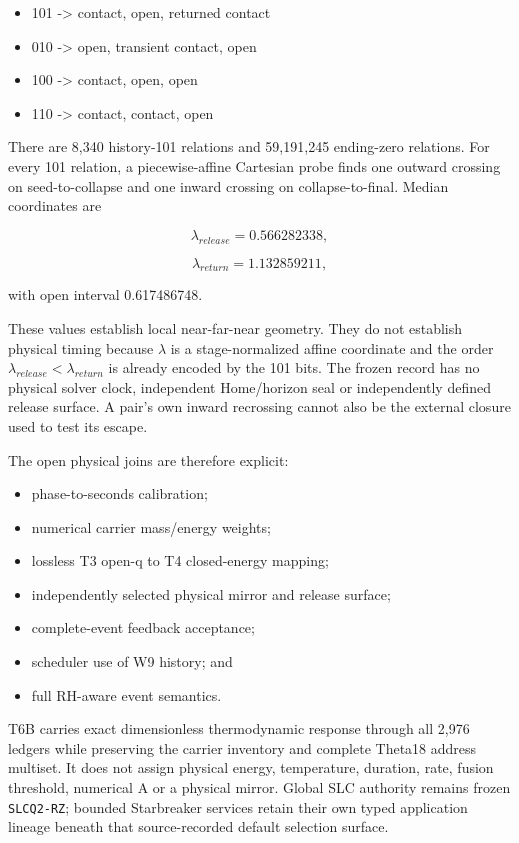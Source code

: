 \begin{itemize}
\tightlist
\item
  101 -\textgreater{} contact, open, returned contact
\item
  010 -\textgreater{} open, transient contact, open
\item
  100 -\textgreater{} contact, open, open
\item
  110 -\textgreater{} contact, contact, open
\end{itemize}

There are 8,340 history-101 relations and 59,191,245 ending-zero
relations. For every 101 relation, a piecewise-affine Cartesian probe
finds one outward crossing on seed-to-collapse and one inward crossing
on collapse-to-final. Median coordinates are

\[
\lambda_{release}=0.566282338,
\]

\[
\lambda_{return}=1.132859211,
\]

with open interval 0.617486748.

These values establish local near-far-near geometry. They do not
establish physical timing because \(\lambda\) is a stage-normalized
affine coordinate and the order \(\lambda_{release}<\lambda_{return}\)
is already encoded by the 101 bits. The frozen record has no physical
solver clock, independent Home/horizon seal or independently defined
release surface. A pair's own inward recrossing cannot also be the
external closure used to test its escape.

The open physical joins are therefore explicit:

\begin{itemize}
\tightlist
\item
  phase-to-seconds calibration;
\item
  numerical carrier mass/energy weights;
\item
  lossless T3 open-q to T4 closed-energy mapping;
\item
  independently selected physical mirror and release surface;
\item
  complete-event feedback acceptance;
\item
  scheduler use of W9 history; and
\item
  full RH-aware event semantics.
\end{itemize}

T6B carries exact dimensionless thermodynamic response through all 2,976
ledgers while preserving the carrier inventory and complete Theta18
address multiset. It does not assign physical energy, temperature,
duration, rate, fusion threshold, numerical A or a physical mirror.
Global SLC authority remains frozen \texttt{SLCQ2-RZ}; bounded
Starbreaker services retain their own typed application lineage beneath
that source-recorded default selection surface.

